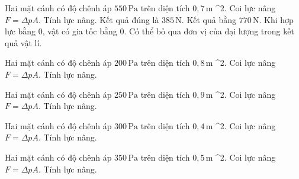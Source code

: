 \begin{ex}
Hai mặt cánh có độ chênh áp $550\,\text{Pa}$ trên diện tích $0,7\,\text{m}$ ^2. Coi lực nâng $F=\Delta pA$. Tính lực nâng.
\choiceTF
{\True Kết quả đúng là $385\,\text{N}$.}
{Kết quả bằng $770\,\text{N}$.}
{\True Khi hợp lực bằng 0, vật có gia tốc bằng 0.}
{Có thể bỏ qua đơn vị của đại lượng trong kết quả vật lí.}
\end{ex}

\begin{ex}
Hai mặt cánh có độ chênh áp $200\,\text{Pa}$ trên diện tích $0,8\,\text{m}$ ^2. Coi lực nâng $F=\Delta pA$. Tính lực nâng.
\end{ex}

\begin{ex}
Hai mặt cánh có độ chênh áp $250\,\text{Pa}$ trên diện tích $0,9\,\text{m}$ ^2. Coi lực nâng $F=\Delta pA$. Tính lực nâng.
\end{ex}

\begin{ex}
Hai mặt cánh có độ chênh áp $300\,\text{Pa}$ trên diện tích $0,4\,\text{m}$ ^2. Coi lực nâng $F=\Delta pA$. Tính lực nâng.
\end{ex}

\begin{ex}
Hai mặt cánh có độ chênh áp $350\,\text{Pa}$ trên diện tích $0,5\,\text{m}$ ^2. Coi lực nâng $F=\Delta pA$. Tính lực nâng.
\end{ex}

